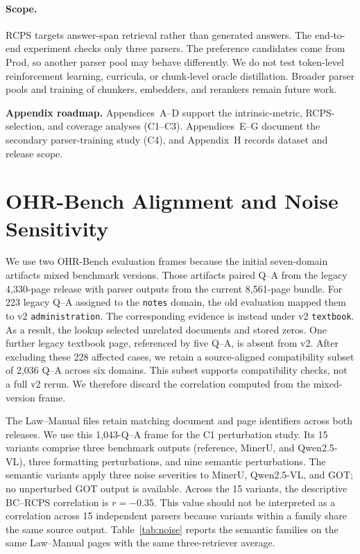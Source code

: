 \documentclass[11pt]{article}
\newcommand{\rcps}{\textnormal{\textsc{RCPS}}}
\newcommand{\contribIntrinsic}{C1}
\newcommand{\contribCoverage}{C3}
\newcommand{\contribTraining}{C4}
\begin{document}
\paragraph{Scope.} \rcps{} targets answer-span retrieval rather than generated answers. The end-to-end experiment checks only three parsers. The preference candidates come from Prod, so another parser pool may behave differently. We do not test token-level reinforcement learning, curricula, or chunk-level oracle distillation. Broader parser pools and training of chunkers, embedders, and rerankers remain future work.



\appendix

\noindent\textbf{Appendix roadmap.} Appendices~A--D support the intrinsic-metric, \rcps{}-selection, and coverage analyses (\contribIntrinsic--\contribCoverage). Appendices~E--G document the secondary parser-training study (\contribTraining), and Appendix~H records dataset and release scope.

\section{OHR-Bench Alignment and Noise Sensitivity}
\label{app:noise}

We use two OHR-Bench evaluation frames because the initial seven-domain artifacts mixed benchmark versions. Those artifacts paired Q--A from the legacy 4{,}330-page release with parser outputs from the current 8{,}561-page bundle. For 223 legacy Q--A assigned to the \texttt{notes} domain, the old evaluation mapped them to v2 \texttt{administration}. The corresponding evidence is instead under v2 \texttt{textbook}. As a result, the lookup selected unrelated documents and stored zeros. One further legacy textbook page, referenced by five Q--A, is absent from v2. After excluding these 228 affected cases, we retain a source-aligned compatibility subset of 2{,}036 Q--A across six domains. This subset supports compatibility checks, not a full v2 rerun. We therefore discard the correlation computed from the mixed-version frame.

The Law--Manual files retain matching document and page identifiers across both releases. We use this 1{,}043-Q--A frame for the \contribIntrinsic{} perturbation study. Its 15 variants comprise three benchmark outputs (reference, MinerU, and Qwen2.5-VL), three formatting perturbations, and nine semantic perturbations. The semantic variants apply three noise severities to MinerU, Qwen2.5-VL, and GOT; no unperturbed GOT output is available. Across the 15 variants, the descriptive BC--\rcps{} correlation is $r=-0.35$. This value should not be interpreted as a correlation across 15 independent parsers because variants within a family share the same source output. Table~\ref{tab:noise} reports the semantic families on the same Law--Manual pages with the same three-retriever average.
\end{document}
